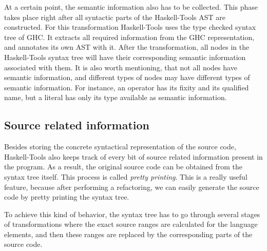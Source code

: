 \documentclass[main.tex]{subfiles}
\begin{document}
	At a certain point, the semantic information also has to be collected. This phase takes place right after all syntactic parts of the Haskell-Tools AST are constructed. For this transformation Haskell-Tools uses the type checked syntax tree of GHC. It extracts all required information from the GHC representation, and annotates its own AST with it. After the transformation, all nodes in the Haskell-Tools syntax tree will have their corresponding semantic information associated with them. It is also worth mentioning, that not all nodes have semantic information, and different types of nodes may have different types of semantic information. For instance, an operator has its fixity and its qualified name, but a literal has only its type available as semantic information.
	
	
	\subsection{Source related information}
	
	Besides storing the concrete syntactical representation of the source code, Haskell-Tools also keeps track of every bit of source related information present in the program. As a result, the original source code can be obtained from the syntax tree itself. This process is called \emph{pretty printing}. This is a really useful feature, because after performing a refactoring, we can easily generate the source code by pretty printing the syntax tree.
	
	To achieve this kind of behavior, the syntax tree has to go through several stages of transformations where the exact source ranges are calculated for the language elements, and then these ranges are replaced by the corresponding parts of the source code.
	
\end{document}
